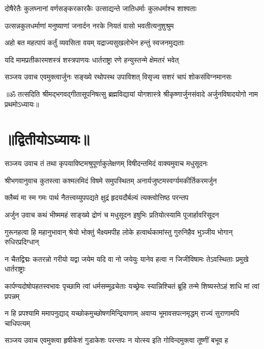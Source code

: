 \twolineshloka
{दोषैरेतैः कुलघ्नानां वर्णसङ्करकारकैः}
{उत्साद्यन्ते जातिधर्माः कुलधर्माश्च शाश्वताः}%

\twolineshloka
{उत्सन्नकुलधर्माणां मनुष्याणां जनार्दन}
{नरके नियतं वासो भवतीत्यनुशुश्रुम}%

\twolineshloka
{अहो बत महत्पापं कर्तुं व्यवसिता वयम्}
{यद्राज्यसुखलोभेन हन्तुं स्वजनमुद्यताः}%

\twolineshloka
{यदि मामप्रतीकारमशस्त्रं शस्त्रपाणयः}
{धार्तराष्ट्रा रणे हन्युस्तन्मे क्षेमतरं भवेत्}%

{सञ्जय उवाच}
\twolineshloka
{एवमुक्त्वार्जुनः सङ्ख्ये रथोपस्थ उपाविशत्}
{विसृज्य सशरं चापं शोकसंविग्नमानसः}%

{॥ॐ तत्सदिति श्रीमद्भगवद्गीतासूपनिषत्सु ब्रह्मविद्यायां योगशास्त्रे श्रीकृष्णार्जुनसंवादे अर्जुनविषादयोगो नाम प्रथमोऽध्यायः॥}

\section{॥द्वितीयोऽध्यायः॥}

{सञ्जय उवाच}
\twolineshloka
{तं तथा कृपयाविष्टमश्रुपूर्णाकुलेक्षणम्}
{विषीदन्तमिदं वाक्यमुवाच मधुसूदनः}%

{श्रीभगवानुवाच}
\twolineshloka
{कुतस्त्वा कश्मलमिदं विषमे समुपस्थितम्}
{अनार्यजुष्टमस्वर्ग्यमकीर्तिकरमर्जुन}%

\twolineshloka
{क्लैब्यं मा स्म गमः पार्थ नैतत्त्वय्युपपद्यते}
{क्षुद्रं हृदयदौर्बल्यं त्यक्त्वोत्तिष्ठ परन्तप}%

{अर्जुन उवाच}
\twolineshloka
{कथं भीष्ममहं साङ्ख्ये द्रोणं च मधुसूदन}
{इषुभिः प्रतियोत्स्यामि पूजार्हावरिसूदन}%

\fourlineindentedshloka
{गुरूनहत्वा हि महानुभावान्}
{श्रेयो भोक्तुं भैक्ष्यमपीह लोके}
{हत्वार्थकामांस्तु गुरुनिहैव}
{भुञ्जीय भोगान् रुधिरप्रदिग्धान्}%

\fourlineindentedshloka
{न चैतद्विद्मः कतरन्नो गरीयो}
{यद्वा जयेम यदि वा नो जयेयुः}
{यानेव हत्वा न जिजीविषामः}
{तेऽवस्थिताः प्रमुखे धार्तराष्ट्राः}%

\fourlineindentedshloka
{कार्पण्यदोषोपहतस्वभावः}
{पृच्छामि त्वां धर्मसम्मूढचेताः}
{यच्छ्रेयः स्यान्निश्चितं ब्रूहि तन्मे}
{शिष्यस्तेऽहं शाधि मां त्वां प्रपन्नम्}%

\fourlineindentedshloka
{न हि प्रपश्यामि ममापनुद्याद्}
{यच्छोकमुच्छोषणमिन्द्रियाणाम्}
{अवाप्य भूमावसपत्नमृद्धम्}
{राज्यं सुराणामपि चाधिपत्यम्}%

{सञ्जय उवाच}
\twolineshloka
{एवमुक्त्वा हृषीकेशं गुडाकेशः परन्तपः}
{न योत्स्य इति गोविन्दमुक्त्वा तूष्णीं बभूव ह}%

